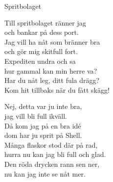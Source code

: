 \begin{song}{Spritbolaget}
	
	
	
	
	Till spritbolaget ränner jag\\
	och bankar på dess port.\\
	Jag vill ha nåt som bränner bra\\
	och gör mig skitfull fort.\\
	Expediten undra och sa\\
	hur gammal kan min herre va?\\
	Har du nåt leg, ditt fula drägg?\\
	Kom hit tillbaks när du fått skägg!
	
	Nej, detta var ju inte bra,\\
	jag vill bli full ikväll.\\
	Då kom jag på en bra idé\\
	dom har ju sprit på Shell.\\
	Många flaskor stod där på rad,\\
	hurra nu kan jag bli full och glad.\\
	Den röda drycken rann sen ner,\\
	nu kan jag inte se nåt mer.
	
\end{song}
